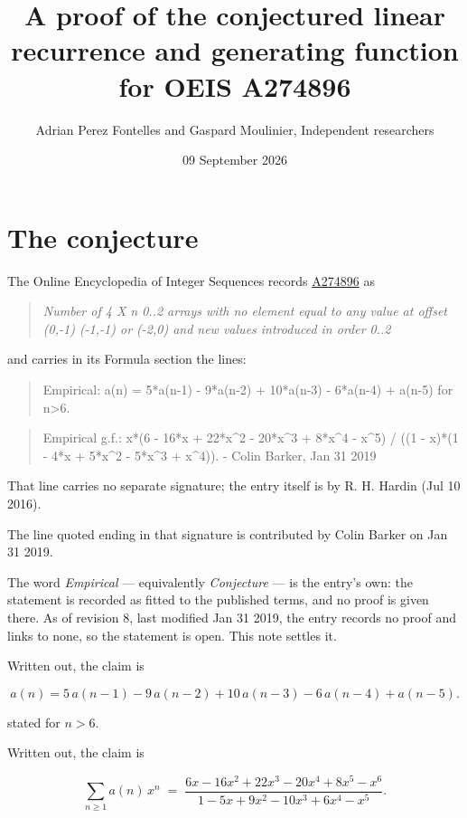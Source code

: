 \documentclass[11pt]{article}
\title{A proof of the conjectured linear recurrence and generating function for OEIS A274896}
\author{Adrian Perez Fontelles and Gaspard Moulinier, Independent researchers}
\date{09 September 2026}
\theoremstyle{definition}
\begin{document}
\maketitle
\section{The conjecture}

The Online Encyclopedia of Integer Sequences records \href{https://oeis.org/A274896}{A274896} as

\begin{quote}\itshape Number of 4 X n 0..2 arrays with no element equal to any value at offset (0,-1) (-1,-1) or (-2,0) and new values introduced in order 0..2\end{quote}

and carries in its Formula section the lines:

\begin{quote}\ttfamily Empirical: a(n) = 5*a(n-1) - 9*a(n-2) + 10*a(n-3) - 6*a(n-4) + a(n-5) for n>6.\end{quote}

\begin{quote}\ttfamily Empirical g.f.: x*(6 - 16*x + 22*x\textasciicircum{}2 - 20*x\textasciicircum{}3 + 8*x\textasciicircum{}4 - x\textasciicircum{}5) / ((1 - x)*(1 - 4*x + 5*x\textasciicircum{}2 - 5*x\textasciicircum{}3 + x\textasciicircum{}4)). - Colin Barker, Jan 31 2019\end{quote}

That line carries no separate signature; the entry itself is by R. H. Hardin (Jul 10 2016).

The line quoted ending in that signature is contributed by Colin Barker on Jan 31 2019.

The word {\itshape Empirical} --- equivalently {\itshape Conjecture} --- is the entry's own: the statement is recorded as fitted to the published terms, and no proof is given there. As of revision 8, last modified Jan 31 2019, the entry records no proof and links to none, so the statement is open. This note settles it.

Written out, the claim is

\[a(n) = 5\,a(n-1) - 9\,a(n-2) + 10\,a(n-3) - 6\,a(n-4) + a(n-5).\]

stated for $n > 6$.

Written out, the claim is

\[\sum_{n \ge 1} a(n)\,x^n \;=\; \frac{6x - 16x^{2} + 22x^{3} - 20x^{4} + 8x^{5} - x^{6}}{1 - 5x + 9x^{2} - 10x^{3} + 6x^{4} - x^{5}}.\]
\end{document}
